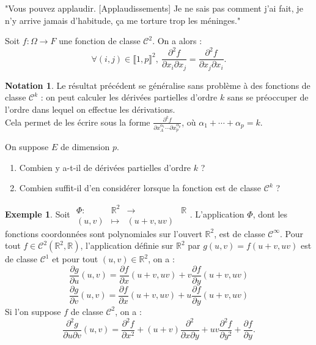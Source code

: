 \documentclass[french]{article}
\newcommand{\R}{\mathbb{R}}
\theoremstyle{plain}
\theoremstyle{definition}
\newtheorem*{ex}{Exemple}
\newtheorem*{notation}{Notation}
\theoremstyle{remark}
\begin{document}
"Vous pouvez applaudir. [Applaudissements] Je ne sais pas comment j'ai fait, je n'y arrive jamais d'habitude, ça me torture trop les méninges."

\begin{thm}%
	Soit $f:\Omega\to F$ une fonction de classe $\mathcal{C}^2$. On a alors :
	$$\forall (i,j)\in\llbracket1,p\rrbracket^2,\ \frac{\partial^2f}{\partial x_i\partial x_j}=\frac{\partial^2f}{\partial x_j\partial x_i}.$$
\end{thm}

\begin{notation}
	Le résultat précédent se généralise sans problème à des fonctions de classe $\mathcal{C}^k$ : on peut calculer les dérivées partielles d'ordre $k$ sans se préoccuper de l'ordre dans lequel on effectue les dérivations.\\
	Cela permet de les écrire sous la forme $\displaystyle\frac{\partial^k f}{\partial x_A^{\alpha_1}\cdots\partial x_p^{\alpha_p}}$, où $\alpha_1+\cdots+\alpha_p=k$. 
\end{notation}

\begin{exo}
	On suppose $E$ de dimension $p$.
	\begin{enumerate}
		\item Combien y a-t-il de dérivées partielles d'ordre $k$ ? %
		\item Combien suffit-il d'en considérer lorsque la fonction est de classe $\mathcal{C}^k$ ? %
	\end{enumerate}
\end{exo}

\begin{ex}
	Soit $\begin{array}{lrcl}
		\Phi:&\R^2&\longrightarrow&\R\\
		(u,v)&\longmapsto&(u+v,uv)
	\end{array}$. L'application $\Phi$, dont les fonctions coordonnées sont polynomiales sur l'ouvert $\R^2$, est de classe $\mathcal{C}^\infty$. Pour tout $f\in\mathcal{C}^2(\R^2,\R)$, l'application définie sur $\R^2$ par $g(u,v)=f(u+v,uv)$ est de classe $\mathcal{C}^1$ et pour tout $(u,v)\in\R^2$, on a :
	$$\frac{\partial g}{\partial u}(u,v)=\frac{\partial f}{\partial x}(u+v,uv)+v\frac{\partial f}{\partial y}(u+v,uv)$$
	$$\frac{\partial g}{\partial v}(u,v)=\frac{\partial f}{\partial x}(u+v,uv)+u\frac{\partial f}{\partial y}(u+v,uv)$$
	Si l'on suppose $f$ de classe $\mathcal{C}^2$, on a :
	$$\frac{\partial^2 g}{\partial u\partial v}(u,v)=\frac{\partial^2 f}{\partial x^2}+(u+v)\frac{\partial^2}{\partial x\partial y}+uv\frac{\partial^2f}{\partial y^2}+\frac{\partial f}{\partial y}.$$
\end{ex}
\end{document}
